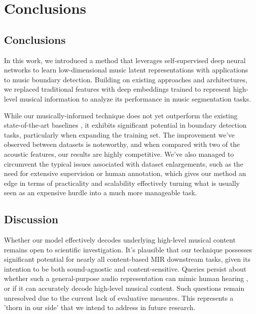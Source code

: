 \chapter{Conclusions}

\section{Conclusions}

In this work, we introduced a method that leverages self-supervised deep neural networks to learn low-dimensional music latent representations with applications to music boundary detection. Building on existing approaches and architectures, we replaced traditional features with deep embeddings trained to represent high-level musical information to analyze its performance in music segmentation tasks.

While our musically-informed technique does not yet outperform the existing state-of-the-art baselines \cite{deepfeaturesegment, SalamonDeepSegmentation}, it exhibits significant potential in boundary detection tasks, particularly when expanding the training set. The improvement we've observed between datasets is noteworthy, and when compared with two of the acoustic features, our results are highly competitive. We've also managed to circumvent the typical issues associated with dataset enlargements, such as the need for extensive supervision or human annotation, which gives our method an edge in terms of practicality and scalability effectively turning what is usually seen as an expensive hurdle into a much more manageable task.

\section{Discussion}

Whether our model effectively decodes underlying high-level musical content remains open to scientific investigation. It's plausible that our technique possesses significant potential for nearly all content-based MIR downstream tasks, given its intention to be both sound-agnostic and content-sensitive. Queries persist about whether such a general-purpose audio representation can mimic human hearing \cite{Li2023MERT:Training, Turian2022HEAR:Representations}, or if it can accurately decode high-level musical content. Such questions remain unresolved due to the current lack of evaluative measures. This represents a 'thorn in our side' that we intend to address in future research.

